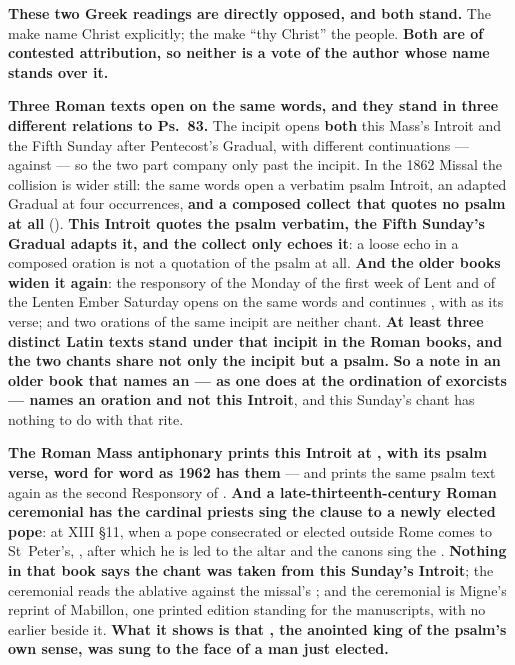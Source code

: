 \textbf{These two Greek readings are directly opposed, and both stand.} The
 make  name Christ explicitly; the
 make ``thy Christ'' the people. \textbf{Both are of
contested attribution, so neither is a vote of the author whose name stands over
it.}

\textbf{Three Roman texts open on the same words, and they stand in three
different relations to Ps.~83.} The incipit  opens \textbf{both} this Mass's
Introit and the Fifth Sunday after Pentecost's Gradual, with different
continuations ---  against  --- so the two part company only past the incipit. In the 1862 Missal
the collision is wider still: the same words open a verbatim psalm Introit, an
adapted Gradual at four occurrences, \textbf{and a composed collect that quotes
no psalm at all} (). \textbf{This Introit quotes the psalm
verbatim, the Fifth Sunday's Gradual adapts it, and the collect only echoes
it}: a loose echo in a composed oration is not a quotation of the psalm at all.
\textbf{And the older books widen it again}: the responsory of the Monday of the
first week of Lent and of the Lenten Ember Saturday opens on the same words and
continues , with  as its verse; and two orations of the same
incipit are neither chant. \textbf{At least three distinct Latin texts stand
under that incipit in the Roman books, and the two chants share not only the
incipit but a psalm.} \textbf{So a note in an older book that names an
 --- as one does at the ordination of
exorcists --- names an oration and not this Introit}, and this Sunday's chant
has nothing to do with that rite.

\textbf{The Roman Mass antiphonary prints this Introit at
, with its psalm verse, word for word as 1962
has them} --- and prints the same psalm text again as the second Responsory of
. \textbf{And a late-thirteenth-century Roman
ceremonial has the cardinal priests sing the clause to a newly elected pope}: at
 XIII \S11, when a pope consecrated or elected outside Rome
comes to St~Peter's, , after which he is led to
the altar and the canons sing the . \textbf{Nothing in that book
says the chant was taken from this Sunday's Introit}; the ceremonial reads the ablative  against the
missal's ; and the ceremonial is Migne's reprint of
Mabillon, one printed edition standing for the manuscripts, with no earlier
 beside it. \textbf{What it shows is that , the
anointed king of the psalm's own sense, was sung to the face of a man just
elected.}

